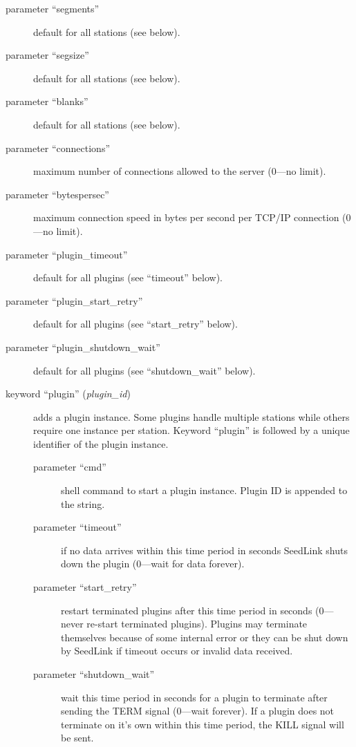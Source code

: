 \documentclass[11pt,a4paper,titlepage]{article}
\begin{document}
\begin{description}
\item[parameter ``segments'' ] default for all stations (see below).

\item[parameter ``segsize'' ] default for all stations (see
below).

\item[parameter ``blanks'' ] default for all stations (see
below).

\item[parameter ``connections'' ] maximum number of connections
allowed to the server (0---no limit).

\item[parameter ``bytespersec'' ] maximum connection speed in bytes
per second per TCP/IP connection (0---no limit).

\item[parameter ``plugin\_timeout'' ] default for all plugins (see
``timeout'' below).

\item[parameter ``plugin\_start\_retry'' ] default for all plugins
(see ``start\_retry'' below).

\item[parameter ``plugin\_shutdown\_wait'' ] default for all plugins
(see ``shutdown\_wait'' below).

\item[keyword ``plugin'' (\textit{plugin\_id})] adds a plugin instance. Some
plugins handle multiple stations while others require one instance per
station. Keyword ``plugin'' is followed by a unique identifier of the
plugin instance.

\begin{description}
\item[parameter ``cmd''] shell command to start a plugin instance. Plugin
ID is appended to the string.

\item[parameter ``timeout''] if no data arrives within this time period in
seconds SeedLink shuts down the plugin (0---wait for data forever).

\item[parameter ``start\_retry''] restart terminated plugins after this
time period in seconds (0---never re-start terminated plugins). Plugins may
terminate themselves because of some internal error or they can be shut
down by SeedLink if timeout occurs or invalid data received.

\item[parameter ``shutdown\_wait''] wait this time period in seconds
for a plugin to terminate after sending the TERM signal (0---wait
forever). If a plugin does not terminate on it's own within this time
period, the KILL signal will be sent.


\end{description}
\end{description}
\end{document}
